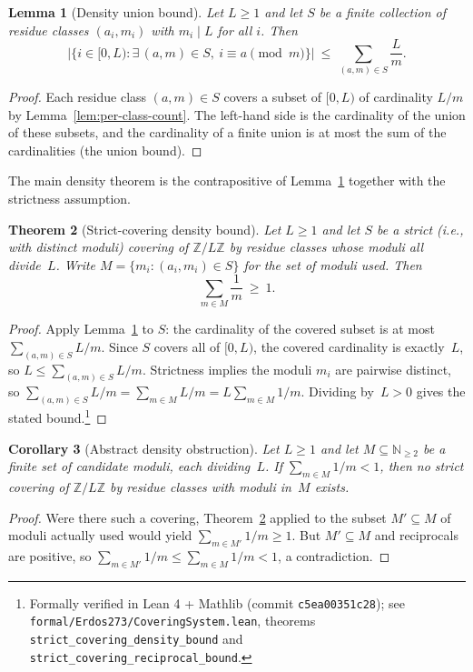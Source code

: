 \documentclass[11pt,a4paper]{article}
\theoremstyle{plain}
\newtheorem{theorem}{Theorem}
\newtheorem{lemma}[theorem]{Lemma}
\newtheorem{corollary}[theorem]{Corollary}
\theoremstyle{definition}
\theoremstyle{remark}
\begin{document}
\begin{lemma}[Density union bound]
\label{lem:density}
Let $L \geq 1$ and let $S$ be a finite collection of residue classes
$(a_i, m_i)$ with $m_i \mid L$ for all $i$. Then
\[
  \bigl| \{ i \in [0, L) : \exists\, (a, m) \in S,\ i \equiv a
  \pmod{m} \} \bigr|
  \ \leq\ \sum_{(a, m) \in S} \frac{L}{m}.
\]
\end{lemma}
\begin{proof}
Each residue class $(a, m) \in S$ covers a subset of $[0, L)$ of
cardinality $L / m$ by Lemma~\ref{lem:per-class-count}. The
left-hand side is the cardinality of the union of these subsets, and
the cardinality of a finite union is at most the sum of the
cardinalities (the union bound).
\end{proof}

The main density theorem is the contrapositive of
Lemma~\ref{lem:density} together with the strictness assumption.

\begin{theorem}[Strict-covering density bound]
\label{thm:density}
Let $L \geq 1$ and let $S$ be a strict (i.e., with distinct moduli)
covering of $\mathbb{Z}/L\mathbb{Z}$ by residue classes whose moduli
all divide~$L$. Write $M = \{ m_i : (a_i, m_i) \in S \}$ for the
set of moduli used. Then
\[
  \sum_{m \in M} \frac{1}{m} \ \geq\ 1.
\]
\end{theorem}
\begin{proof}
Apply Lemma~\ref{lem:density} to $S$: the cardinality of the
covered subset is at most $\sum_{(a, m) \in S} L/m$. Since $S$
covers all of $[0, L)$, the covered cardinality is exactly~$L$, so
$L \leq \sum_{(a, m) \in S} L/m$. Strictness implies the
moduli $m_i$ are pairwise distinct, so $\sum_{(a, m) \in S} L/m =
\sum_{m \in M} L/m = L \sum_{m \in M} 1/m$. Dividing by~$L > 0$
gives the stated bound.\footnote{Formally verified in Lean 4 +
Mathlib (commit \texttt{c5ea00351c28}); see
\texttt{formal/Erdos273/CoveringSystem.lean}, theorems
\texttt{strict\_covering\_density\_bound} and
\texttt{strict\_covering\_reciprocal\_bound}.}
\end{proof}

\begin{corollary}[Abstract density obstruction]
\label{cor:abstract-obstruction}
Let $L \geq 1$ and let $M \subseteq \mathbb{N}_{\geq 2}$ be a finite
set of candidate moduli, each dividing~$L$. If
$\sum_{m \in M} 1/m < 1$, then no strict covering of
$\mathbb{Z}/L\mathbb{Z}$ by residue classes with moduli in~$M$
exists.
\end{corollary}
\begin{proof}
Were there such a covering, Theorem~\ref{thm:density} applied to
the subset $M' \subseteq M$ of moduli actually used would yield
$\sum_{m \in M'} 1/m \geq 1$. But $M' \subseteq M$ and reciprocals
are positive, so $\sum_{m \in M'} 1/m \leq \sum_{m \in M} 1/m < 1$,
a contradiction.
\end{proof}
\end{document}
